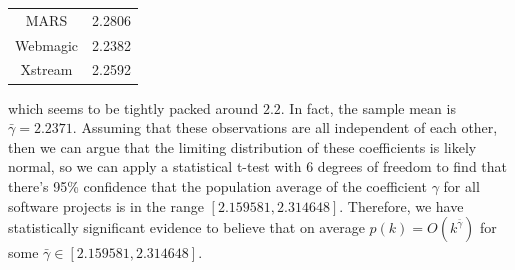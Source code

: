 \documentclass[11pt,a4paper,twocolumn]{article}
\begin{document}
\begin{singlespace}
\begin{table}[H]
\begin{tabular}{|c|c|}
MARS & 2.2806 \\
Webmagic & 2.2382 \\
Xstream & 2.2592 \\ \hline
\end{tabular}
\end{table}
which seems to be tightly packed around $2.2$. In fact, the sample mean is 
$\bar \gamma = 2.2371$. Assuming that these observations are all independent
of each other, then we can argue that the limiting distribution of these coefficients
is likely normal, so we can apply a statistical t-test with 6 degrees of freedom to find
that there's 95\% confidence that the population average of the coefficient $\gamma$ 
for all software projects is in the range $[2.159581, 2.314648]$. Therefore, we have
 statistically significant evidence to believe that on average 
 $p(k) = O(k^{\bar \gamma})$ for some $\bar \gamma \in [2.159581, 2.314648]$.




\printbibliography[title={References}]

\end{singlespace}
\end{document}
